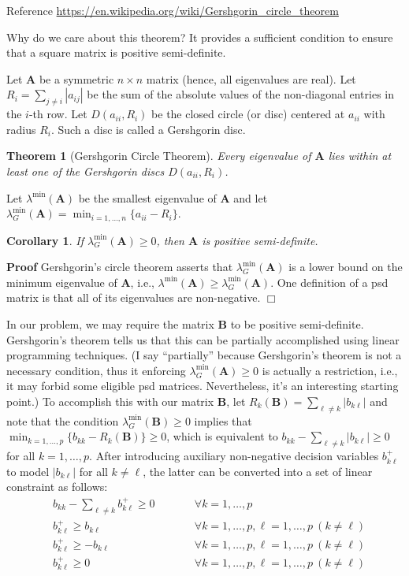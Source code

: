 \documentclass[]{article}
\renewcommand{\v}[1]{\ensuremath{\mathbf{#1}}}
\newtheorem{theorem}{Theorem}
\newtheorem{corollary}{Corollary}
\newcommand{\pf}{\textbf{Proof} \indent}
\newcommand{\qed}{\hfill $\Box$}
\newcommand{\proof}{\pf}
\begin{document}
Reference \url{https://en.wikipedia.org/wiki/Gershgorin_circle_theorem}

Why do we care about this theorem? It provides a sufficient condition to ensure that a square matrix is positive semi-definite.

Let $\v{A}$ be a symmetric $n \times n$ matrix (hence, all eigenvalues are real).
Let $R_{i}=\sum _{j\neq {i}} \left|a_{ij}\right|$ be the sum of the absolute values of the non-diagonal entries in the $i$-th row. Let $D(a_{ii},R_{i})$ be the closed circle (or disc) centered at $a_{ii}$ with radius $R_{i}$. Such a disc is called a Gershgorin disc.

\begin{theorem}[Gershgorin Circle Theorem]
Every eigenvalue of $\v{A}$ lies within at least one of the Gershgorin discs $D(a_{ii},R_{i})$.
\end{theorem}

Let $\lambda^{\min}(\v{A})$ be the smallest eigenvalue of $\v{A}$ and let $\lambda_G^{\min}(\v{A}) = \min_{i=1,\ldots,n} \{a_{ii} - R_i\}$.
\begin{corollary}
If $\lambda_G^{\min}(\v{A}) \geq 0$, then $\v{A}$ is positive semi-definite. 
\end{corollary}
\proof Gershgorin's circle theorem asserts that $\lambda_G^{\min}(\v{A})$ is a lower bound on the minimum eigenvalue of $\v{A}$, i.e., $\lambda^{\min}(\v{A}) \geq \lambda_G^{\min}(\v{A})$.  One definition of a psd matrix is that all of its eigenvalues are non-negative. \qed

In our problem, we may require the matrix $\v{B}$ to be positive semi-definite.  Gershgorin's theorem tells us that this can be partially accomplished using linear programming techniques.  (I say ``partially'' because Gershgorin's theorem is not a necessary condition, thus it enforcing $\lambda_G^{\min}(\v{A}) \geq 0$ is actually a restriction, i.e., it may forbid some eligible psd matrices.  Nevertheless, it's an interesting starting point.)  To accomplish this with our matrix $\v{B}$, let $R_{k}(\v{B})=\sum _{\ell \neq k} \left|b_{k\ell}\right|$ and note that the condition $\lambda_G^{\min}(\v{B}) \geq 0$ implies that $\min_{k=1,\ldots,p} \{b_{kk} - R_k(\v{B})\} \geq 0$, which is equivalent to $b_{kk} - \sum _{\ell \neq k} \left|b_{k\ell}\right| \geq 0$ for all $k=1,\ldots,p$.  After introducing auxiliary non-negative decision variables $b^+_{k\ell}$ to model $|b_{k\ell}|$ for all $k \neq \ell$, the latter can be converted into a set of linear constraint as follows:
\begin{subequations} \label{model:gershgorin_restriction}
\begin{alignat}{4}
& b_{kk} - \sum _{\ell \neq k} b^+_{k\ell} \geq 0 && \qquad \forall k=1,\ldots,p \\
& b^+_{k\ell} \geq b_{k\ell} && \qquad \forall k=1,\ldots,p, \ell=1,\ldots,p~(k \neq \ell) \\
& b^+_{k\ell} \geq -b_{k\ell} && \qquad \forall k=1,\ldots,p, \ell=1,\ldots,p~(k \neq \ell) \\
& b^+_{k\ell} \geq 0 && \qquad \forall k=1,\ldots,p, \ell=1,\ldots,p~(k \neq \ell)
\end{alignat}
\end{subequations}
\end{document}
